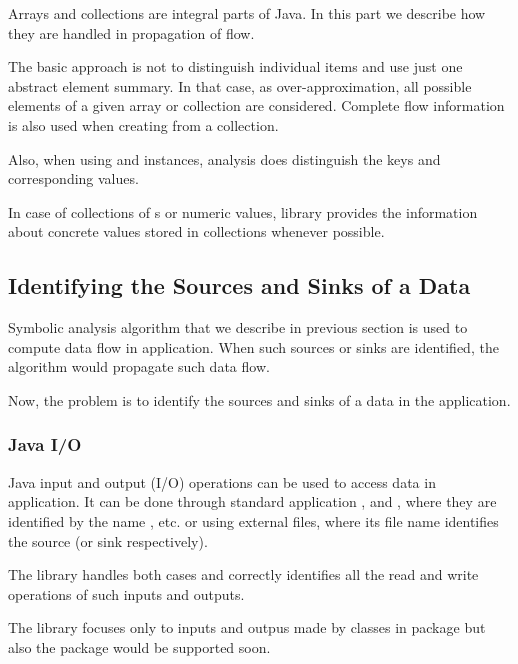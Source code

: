 Arrays and collections are integral parts of Java. In this part we describe how
they are handled in propagation of flow.

The basic approach is not to distinguish individual items and use just one
abstract element summary. In that case, as over-approximation, all possible elements
of a given array or collection are considered.
Complete flow information is also used when creating 
from a collection.

Also, when using  and  instances,
analysis does distinguish the keys and corresponding values.

In case of collections of s or numeric values, library provides
the information about concrete values stored in collections whenever possible.





\subsection{Identifying the Sources and Sinks of a Data}

Symbolic analysis algorithm that we describe in previous section is
used to compute data flow in application.
When such sources or sinks are identified, the algorithm would
propagate such data flow.

Now, the problem is to identify the sources and sinks of a data
in the application.




\subsubsection{Java I/O}

Java input and output (I/O) operations can be used to access data in application.
It can be done through standard application
,  and ,
where they are identified by the name , etc.
or using external files, where its file name identifies the source (or sink respectively).

The library handles both cases and correctly identifies
all the read and write operations of such inputs and outputs.

The library focuses only to inputs and outpus made by classes in  package
but also the  package would be supported soon.




